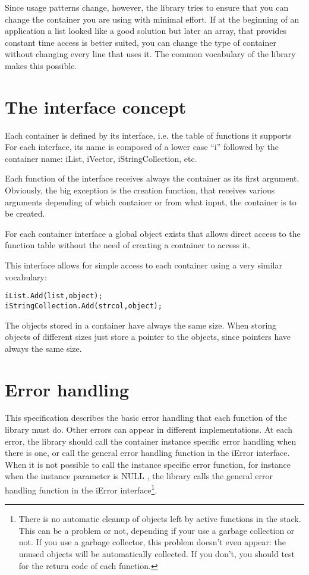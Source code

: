 \documentclass[12pt,a4paper]{memoir} %
\newcommand{\Null}{
{\footnotesize NULL}
}
\begin{document}
Since usage patterns change, however, the library tries to ensure that you can change the container you are using with minimal effort. If at the beginning of an application a list looked like a good solution but later an array, that provides constant time access is better suited, you can change the type of container without changing every line that uses it. The common vocabulary of the library makes this possible.

\section{The interface concept}
Each container is defined by its interface, i.e. the table of functions it supports For each interface, its name is composed of a lower case “i” followed by the container name: iList, iVector, iStringCollection, etc.

Each function of the interface receives always the container as its first argument. Obviously, the big exception is the creation function, that receives various arguments depending of which container or from what input, the container is to be created.

For each container interface a global object exists that allows direct access to the function table without the need of creating a container to access it.

This interface allows for simple access to each container using a very similar vocabulary:
\begin{verbatim}
iList.Add(list,object);
iStringCollection.Add(strcol,object);
\end{verbatim}
The objects stored in a container have always the same size. When storing objects of different sizes just store a pointer to the objects, since pointers have always the same size.
\section{Error handling}
This specification describes the basic error handling that each function of the library must do. Other errors can appear in different implementations.
At each error, the library should call the container instance specific error handling when there is one, or call the general error handling function in the iError interface. When it is not possible to call the instance specific error function, for instance when the instance parameter is\Null, the library calls the general error handling function in the iError interface\footnote{There is no automatic cleanup of objects left by active functions in the stack. This can be a problem or not, depending if your use a garbage collection or not. If you use a garbage collector, this problem doesn't even appear: the unused objects will be automatically collected. If you don't, you should test for the return code of each function.}.
\end{document}
